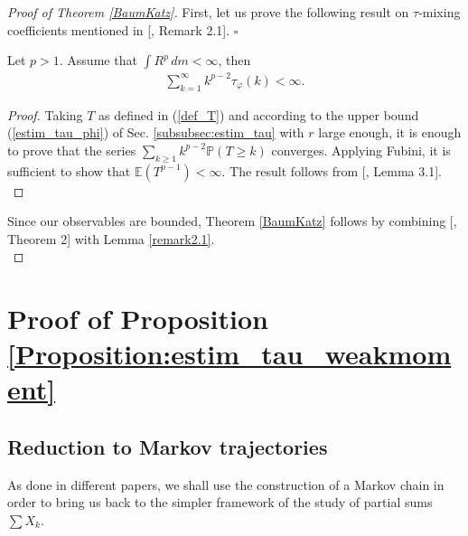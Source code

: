 \documentclass{ws-sd}
\newcommand{\E}{\mathbb{E}}
\newcommand{\Proba}{\mathbb{P}}
\begin{document}
\begin{proof}[Proof of Theorem \ref{BaumKatz}]
    First, let us prove the following result on $\tau$-mixing coefficients mentioned in [, Remark 2.1].
\hfill$\square$
    \begin{lemma}\label{remark2.1}
        Let $p > 1$. Assume that $\int R^p \, dm < \infty$, then
        \begin{align*}
            \sum_{k=1}^{\infty}k^{p-2}\tau_{\varphi}(k) < \infty.
        \end{align*}
    \end{lemma}

    \begin{proof}
        Taking $T$ as defined in (\ref{def_T}) and according to the upper bound (\ref{estim_tau_phi}) of Sec. \ref{subsubsec:estim_tau} with $r$ large enough, it is enough to prove that the series $\sum_{k\ge 1}k^{p-2}\Proba(T \ge k)$ converges.
        Applying Fubini, it is sufficient to show that $\E(T^{p-1}) < \infty$.
        The result follows from [, Lemma 3.1].
        \\
    \end{proof}

    Since our observables are bounded, Theorem \ref{BaumKatz} follows by combining [, Theorem 2] with Lemma \ref{remark2.1}.
    \\
\end{proof}

        \section{Proof of Proposition \ref{Proposition:estim_tau_weakmoment}}

\subsection{Reduction to Markov trajectories }

As done in different papers, we shall use the construction of a Markov chain in order to bring us back to the simpler framework of the study of partial sums $\sum X_k$.
\end{document}
